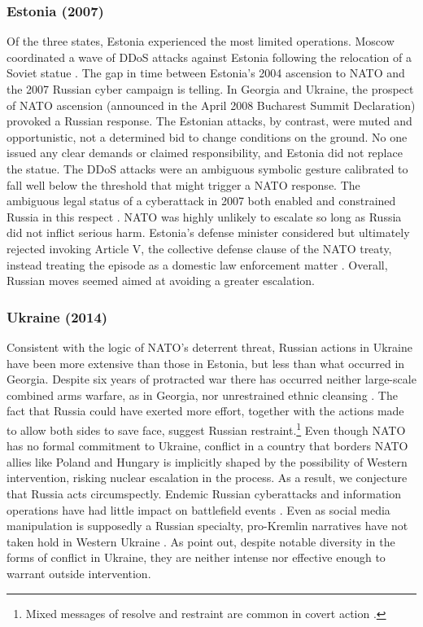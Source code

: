 \documentclass[11pt,letterpaper,pdftex,dvipsnames,table]{article}
\begin{document}
\subsubsection{Estonia (2007)}
Of the three states, Estonia experienced the most limited operations. Moscow coordinated a wave of DDoS attacks against Estonia following the relocation of a Soviet statue \citep{schmidt_estoniancyberattacks_2013}. The gap in time between Estonia’s 2004 ascension to NATO and the 2007 Russian cyber campaign is telling. In Georgia and Ukraine, the prospect of NATO ascension (announced in the April 2008 Bucharest Summit Declaration) provoked a Russian response. The Estonian attacks, by contrast, were muted and opportunistic, not a determined bid to change conditions on the ground. No one issued any clear demands or claimed responsibility, and Estonia did not replace the statue. The DDoS attacks were an ambiguous symbolic gesture calibrated to fall well below the threshold that might trigger a NATO response. The ambiguous legal status of a cyberattack in 2007 both enabled and constrained Russia in this respect \citep{joubert_fiveyearsestonia_2012}. NATO was highly unlikely to escalate so long as Russia did not inflict serious harm. Estonia’s defense minister considered but ultimately rejected invoking Article V, the collective defense clause of the NATO treaty, instead treating the episode as a domestic law enforcement matter \citep{traynor_russiaaccusedunleashing_2007}. Overall, Russian moves seemed aimed at avoiding a greater escalation.

\subsubsection{Ukraine (2014)}
Consistent with the logic of NATO's deterrent threat, Russian actions in Ukraine have been more extensive than those in Estonia, but less than what occurred in Georgia. Despite six years of protracted war there has occurred neither large-scale combined arms warfare, as in Georgia, nor unrestrained ethnic cleansing \citep{driscoll_socialmediarussian_2020}. The fact that Russia could have exerted more effort, together with the actions made to allow both sides to save face, suggest Russian restraint.\footnote{Mixed messages of resolve and restraint are common in covert action \citep{carnegie_spotlightharshglare_2018, carson_secretwarscovert_2018}.} Even though NATO has no formal commitment to Ukraine, conflict in a country that borders NATO allies like Poland and Hungary is implicitly shaped by the possibility of Western intervention, risking nuclear escalation in the process. As a result, we conjecture that Russia acts circumspectly. Endemic Russian cyberattacks and information operations have had little impact on battlefield events \citep{kostyuk_invisibledigitalfront_2019}. Even as social media manipulation is supposedly a Russian specialty, pro-Kremlin narratives have not taken hold in Western Ukraine \citep{driscoll_socialmediarussian_2020}. As \citet{brantly_defendingborderlandukrainian_2017} point out, despite notable diversity in the forms of conflict in Ukraine, they are neither intense nor effective enough to warrant outside intervention. 
\end{document}
